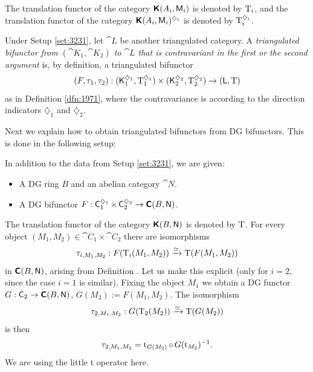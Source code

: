 The translation functor of the category 
$\boldsymbol{\mathsf{K}}(A_i, \operatorname{\mathsf{M}}_i)$ is denoted by $\operatorname{T}_i$, and the  
translation functor of the category 
$\boldsymbol{\mathsf{K}}(A_i, \operatorname{\mathsf{M}}_i)^{\diamondsuit_i}$ is denoted 
by $\operatorname{T}_i^{\diamondsuit_i}$. 

\begin{dfn} \label{dfn:2020}
Under Setup \ref{set:3231}, let $\cat{L}$ be another triangulated 
category. A
{\em triangulated bifunctor from $(\cat{K}_1, \cat{K}_2)$ to $\cat{L}$ that is 
contravariant in the first or the second argument}%
%
is, by definition, a triangulated bifunctor
\[ (F, \tau_1, \tau_2) : 
(\operatorname{\mathsf{K}}_1^{\diamondsuit_1}, \operatorname{T}_1^{\diamondsuit_1}) \times 
(\operatorname{\mathsf{K}}_2^{\diamondsuit_2}, \operatorname{T}_2^{\diamondsuit_2}) 
\to (\operatorname{\mathsf{L}}, \operatorname{T}) \]
as in Definition \ref{dfn:1971}, where the contravariance is according to the 
direction indicators $\diamondsuit_1$ and $\diamondsuit_2$.
\end{dfn}

Next we explain how to obtain triangulated bifunctors from DG bifunctors. 
This is done in the following setup:

\begin{setup} \label{set:3230}
In addition to the data from Setup \ref{set:3231}, we are given: 
\begin{itemize}
\item A DG ring $B$ and an abelian category $\cat{N}$.

\item A DG bifunctor
$F : \operatorname{\mathsf{C}}_1^{\diamondsuit_1} \times \operatorname{\mathsf{C}}_2^{\diamondsuit_2}
\to \boldsymbol{\mathsf{C}}(B, \operatorname{\mathsf{N}})$.
\end{itemize}
\end{setup}

The translation functor of the category 
$\boldsymbol{\mathsf{K}}(B, \operatorname{\mathsf{N}})$ is denoted by $\operatorname{T}$.  
For every object
$(M_1, M_2) \in \cat{C}_1 \times \cat{C}_2$ 
there are isomorphisms
\begin{equation} \label{eqn:2015}
\tau_{i, M_1, M_2} : 
F(\operatorname{T}_i(M_1, M_2))  \xrightarrow{\simeq} \operatorname{T}(F(M_1, M_2))
\end{equation}
in $\boldsymbol{\mathsf{C}}(B, \operatorname{\mathsf{N}})$, arising from Definition \tup{\ref{dfn:1150}}.
Let us make this explicit (only for $i = 2$, since the case $i = 1$ is  
similar). Fixing the object $M_1$ we obtain a DG functor
$G :  \operatorname{\mathsf{C}}_2 \to \boldsymbol{\mathsf{C}}(B, \operatorname{\mathsf{N}})$,  
$G(M_2) := F(M_1, M_2)$. 
The isomorphism 
\[ \tau_{2, M_1, M_2} : G(\operatorname{T}_2(M_2)) \xrightarrow{\simeq} \operatorname{T}(G(M_2)) \]
is then 
\begin{equation} \label{eqn:5042}
\tau_{2, M_1, M_2} = \operatorname{t}_{G(M_2)} \circ \, G(\operatorname{t}_{M_2})^{-1} . 
\end{equation}
We are using the little t operator here. 

